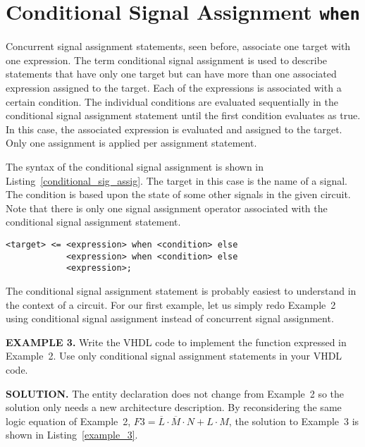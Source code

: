 \section{Conditional Signal Assignment \texttt{when}}
Concurrent signal assignment statements, seen before, associate one target with one expression. The term conditional signal assignment is used to describe statements that have only one target but can have more than one associated expression assigned to the target. Each of the expressions is associated with a certain condition. The individual conditions are evaluated sequentially in the conditional signal assignment statement until the first condition evaluates as true. In this case, the associated expression is evaluated and assigned to the target. Only one assignment is applied per assignment statement.

The syntax of the conditional signal assignment is shown in Listing~\ref{conditional_sig_assig}. The target in this case is the name of a signal. The condition is based upon the state of some other signals in the given circuit. Note that there is only one signal assignment operator associated with the conditional signal assignment statement.

\noindent
\begin{minipage}{0.99\linewidth}
\begin{lstlisting}[label=conditional_sig_assig, caption=The syntax for the conditional signal assignment statement.]
<target> <=	<expression> when <condition> else
			<expression> when <condition> else
			<expression>;
\end{lstlisting}
\end{minipage}

The conditional signal assignment statement is probably easiest to understand in the context of a circuit. For our first example, let us simply redo Example~2 using conditional signal assignment instead of concurrent signal assignment.

\begin{leftbar}
\noindent
\textbf{EXAMPLE 3.}
Write the VHDL code to implement the function expressed in Example~2. Use only conditional signal assignment statements in your VHDL code. 
\end{leftbar}
\noindent
\textbf{SOLUTION.} The entity declaration does not change from Example~2 so the solution only needs a new architecture description. By reconsidering the same logic equation of Example~2, $F3=\overline{L} \cdot \overline{M} \cdot N+L \cdot M$, the solution to Example~3 is shown in Listing~\ref{example_3}.

